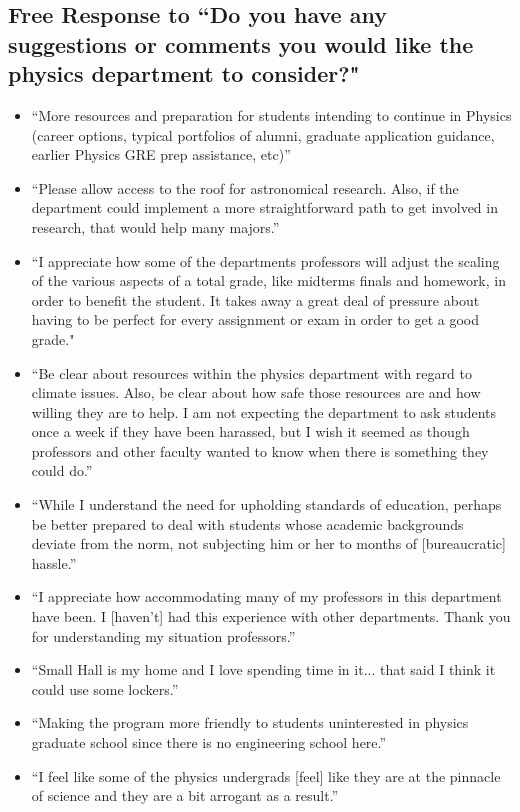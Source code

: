 \documentclass[oneside]{book}   %
\begin{document}
\subsection{Free Response to ``Do you have any suggestions or comments you would like the physics department to consider?"}
\begin{itemize}
	\item “More resources and preparation for students intending to continue in Physics (career options, typical portfolios of alumni, graduate application guidance, earlier Physics GRE prep assistance, etc)”
	\item “Please allow access to the roof for astronomical research. Also, if the department could implement a more straightforward path to get involved in research, that would help many majors.”
	\item “I appreciate how some of the departments professors will adjust the scaling of the various aspects of a total grade, like midterms finals and homework, in order to benefit the student. It takes away a great deal of pressure about having to be perfect for every assignment or exam in order to get a good grade."
	\item “Be clear about resources within the physics department with regard to climate issues. Also, be clear about how safe those resources are and how willing they are to help. I am not expecting the department to ask students once a week if they have been harassed, but I wish it seemed as though professors and other faculty wanted to know when there is something they could do.”
	\item “While I understand the need for upholding standards of education, perhaps be better prepared to deal with students whose academic backgrounds deviate from the norm, not subjecting him or her to months of [bureaucratic] hassle.”
	\item “I appreciate how accommodating many of my professors in this department have been. I [haven't] had this experience with other departments. Thank you for understanding my situation professors.”
	\item “Small Hall is my home and I love spending time in it... that said I think it could use some lockers.”
	\item “Making the program more friendly to students uninterested in physics graduate school since there is no engineering school here.”
	\item “I feel like some of the physics undergrads [feel] like they are at the pinnacle of science and they are a bit arrogant as a result.”
\end{itemize}
\end{document}
